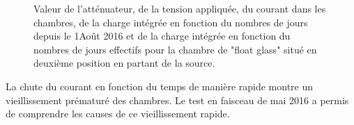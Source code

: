 \begin{figure}[!ht]
	\caption{Valeur de l'atténuateur, de la tension appliquée, du courant dans les chambres, de la charge intégrée en fonction du nombres de jours depuis le 1\ier Août 2016  et de la charge intégrée en fonction du nombres de jours effectifs pour la chambre de "float glass" situé en deuxième position en partant de la source.}
	\label{CourantHR}
\end{figure}

La chute du courant en fonction du temps de manière rapide montre un vieillissement prématuré des chambres. Le test en faisceau de mai 2016 a permis de comprendre les causes de ce vieillissement rapide.

